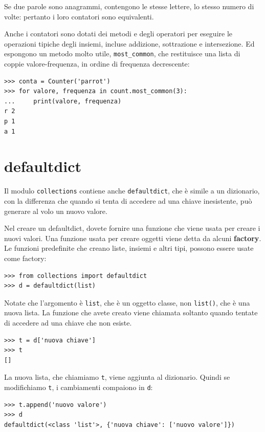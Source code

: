 \documentclass[10pt]{book}
\begin{document}
Se due parole sono anagrammi, contengono le stesse lettere, lo stesso numero di volte: pertanto i loro contatori sono equivalenti.

Anche i contatori sono dotati dei metodi e degli operatori per eseguire le operazioni tipiche degli insiemi, incluse addizione, sottrazione e intersezione.  Ed espongono un metodo molto utile, \verb"most_common", che
restituisce una lista di coppie valore-frequenza, in ordine di frequenza decrescente:

\begin{verbatim}
>>> conta = Counter('parrot')
>>> for valore, frequenza in count.most_common(3):
...     print(valore, frequenza)
r 2
p 1
a 1
\end{verbatim}


\section{defaultdict}

Il modulo {\tt collections} contiene anche {\tt defaultdict}, che è simile a un dizionario, con la differenza che quando si tenta di accedere ad una chiave inesistente, può generare al volo un nuovo valore.

Nel creare un defaultdict, dovete fornire una funzione che viene usata per creare i nuovi valori. Una funzione usata per creare oggetti viene detta da alcuni {\bf factory}. Le funzioni predefinite che creano liste, insiemi e altri tipi, possono essere usate come factory:

\begin{verbatim}
>>> from collections import defaultdict
>>> d = defaultdict(list)
\end{verbatim}

Notate che l'argomento è {\tt list}, che è un oggetto classe, non {\tt list()}, che è una nuova lista. La funzione che avete creato viene chiamata soltanto quando tentate di accedere ad una chiave che non esiste.

\begin{verbatim}
>>> t = d['nuova chiave']
>>> t
[]
\end{verbatim}

La nuova lista, che chiamiamo {\tt t}, viene aggiunta al dizionario. Quindi se modifichiamo {\tt t}, i cambiamenti compaiono in {\tt d}:

\begin{verbatim}
>>> t.append('nuovo valore')
>>> d
defaultdict(<class 'list'>, {'nuova chiave': ['nuovo valore']})
\end{verbatim}
\end{document}
